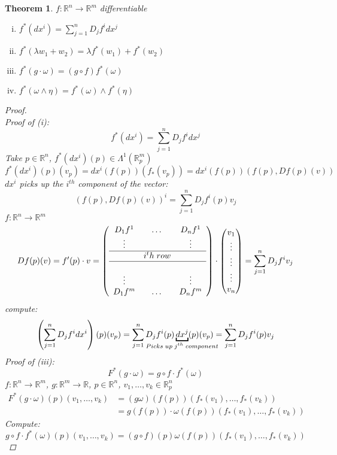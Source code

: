 \documentclass[11pt]{article}
\def\RR{\mathbb{R}}
\newtheorem{theorem}{Theorem}[section]
\begin{document}
\begin{theorem}
$f:\RR^n \rightarrow \RR^m$ differentiable
\begin{enumerate}[(i)]
\item $f^*(dx^i) = \sum_{j=1}^n D_jf^idx^j$
\item $f^*(\lambda w_1 + w_2) =\lambda f^*( w_1) + f^*( w_2)$
\item $f^*(g\cdot \omega) = (g \circ f) f^*(\omega)$
\item $f^*(\omega \wedge \eta) = f^*(\omega) \wedge f^*(\eta)$
\end{enumerate}
\begin{proof}\quad \\
Proof of (i): 
\[f^*(dx^i) = \sum_{j=1}^n D_jf^i dx^j \]
Take $p \in \RR^n$, $f^*(dx^i)(p) \in \Lambda^1(\RR_{p}^m)$
\[f^*(dx^i)(p)(v_p) = dx^i(f(p))(f_*(v_p)) = dx^i(f(p))(f(p),Df(p)(v))\]
$dx^i$ picks up the $i^{th}$ component of the vector:
\[(f(p),Df(p)(v))^i = \sum_{j=1}^n D_jf^i(p)v_j\]
$f:\RR^n \rightarrow \RR^m$ 
\[Df(p)(v) = f'(p)\cdot v = \left( \begin{array}{ccc} D_1f^1 &\dots &D_nf^1\\
\vdots &  &\vdots \\
\hline
& i^th \; row\\
\hline\\
\vdots &  &\vdots\\
 D_1f^m &\dots &D_nf^m
\end{array} \right) \cdot \begin{pmatrix} v_1 \\
\vdots \\ \vdots \\ \vdots \\
v_n \end{pmatrix} = \sum_{j=1}^n D_jf^i v_j\]
compute:
\[\left( \sum_{j=1}^n D_jf^i dx^i\right)(p)(v_p) =  \sum_{j=1}^n D_jf^i(p) \underbracket{dx^j}_{\mathclap{Picks \; up\; j^{th} \; component}} (p)(v_p) =  \sum_{j=1}^n D_jf^i(p) v_j\]
Proof of (iii):\quad \\
\[F^*(g\cdot \omega) = g \circ f \cdot f^*(\omega)\]
$f:\RR^n \rightarrow \RR^m$, $g:\RR^m\rightarrow \RR$, $p \in \RR^n$, $v_1, \dots , v_k \in \RR_{p}^n$
\begin{align*}
F^*(g\cdot \omega)(p)(v_1, \dots, v_k) &= (g\omega)(f(p))(f_*(v_1), \dots , f_*(v_k))\\
&= g(f(p)) \cdot \omega(f(p))(f_*(v_1), \dots , f_*(v_k))
\end{align*}
Compute:
\[g \circ f \cdot f^*(\omega)(p)(v_1, \dots, v_k) = (g\circ f)(p) \omega (f(p))(f_*(v_1), \dots , f_*(v_k))\]
\end{proof}
\end{theorem}
\end{document}
